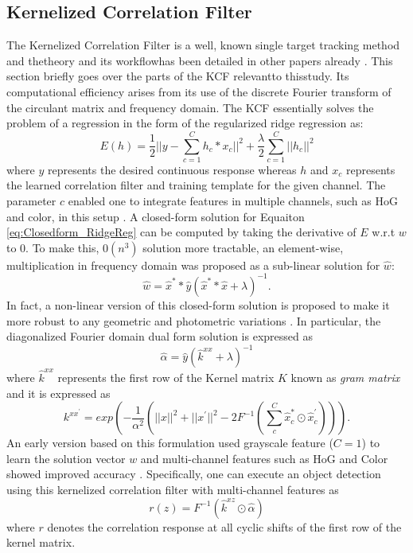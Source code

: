 \documentclass{bmvc2k}
\begin{document}
\subsection{Kernelized Correlation Filter} \label{sec:kcf}
The Kernelized Correlation Filter is a well, known single target
tracking method and thetheory and its workflowhas been detailed in
other papers already
\cite{henriques2012exploiting,henriques2015high}. This section briefly
goes over the parts of the KCF relevantto thisstudy. Its
computational efficiency arises from its use of the discrete Fourier
transform of the circulant matrix and frequency domain. The KCF
essentially solves the problem of a regression in the form of the
regularized ridge regression as:
\begin{equation}
E(h) = \frac{1}{2}||y-\sum_{c=1}^{C}h_{c}*x_{c}||^{2} + \frac{\lambda}{2}\sum_{c=1}^{C}||h_{c}||^{2}
\label{eq:Closedform_RidgeReg}
\end{equation}
where $y$ represents the desired continuous response whereas $h$ and
$x_{c}$ represents the learned correlation filter and training
template for the given channel. The parameter $c$ enabled one to
integrate features in multiple channels, such as HoG and color, in
this setup \cite{henriques2015high,galoogahi2013multi}. A closed-form
solution for Equaiton \ref{eq:Closedform_RidgeReg} can be computed by
taking the derivative of $E$ w.r.t $w$ to $0$. To make this,
$\mathcal{0}(n^{3})$ solution more tractable, an element-wise,
multiplication in frequency domain was proposed as a sub-linear
solution for $\hat{w}$:
\begin{equation}
\hat{w} = \hat{x}^{*}*\hat{y}(\hat{x}^{*}*\hat{x}+\lambda)^{-1}.
\label{eq:DiagonalizedPrimalSolution}
\end{equation}
In fact, a non-linear version of this closed-form solution is proposed
to make it more robust to any geometric and photometric variations
\cite{henriques2015high}. In particular, the diagonalized Fourier
domain dual form solution is expressed as
\begin{equation}
\hat{\alpha} = \hat{y}(\hat{k}^{xx}+\lambda)^{-1}
\label{eq:FourierDualDomainSolution}
\end{equation}
where $\hat{k}^{xx}$ represents the first row of the Kernel matrix $K$
known as \textit{gram matrix} and it is expressed as
\begin{equation}
k^{xx^{'}} = exp(-\dfrac{1}{\alpha^{2}}(||x||^{2}+||x^{'}||^{2}-2F^{-1}(\sum^{C}_{c}\hat{x}_{c}^{*}\odot \hat{x}_{c}^{'}))).
\label{eq:GaussianCorrelationSingleChannel}
\end{equation}
An early version based on this formulation used grayscale feature
($C=1$) to learn the solution vector $w$ and multi-channel features
such as HoG and Color showed improved accuracy
\cite{henriques2015high,galoogahi2013multi,tang2015multi,ma2015long,bibi2015multi}. Specifically,
one can execute an object detection using this kernelized correlation
filter with multi-channel features as 
\begin{equation}
r(z) = F^{-1}(\hat{k}^{xz} \odot \hat{\alpha})
\end{equation}
where $r$ denotes the correlation response at all cyclic shifts of the
first row of the kernel matrix.
\end{document}
